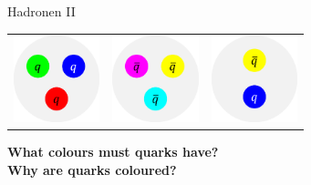 \begin{frame}{Hadronen II}
\begin{table}[]
\begin{tabular}{ccc}
         \includegraphics[width=2.5cm]{Figures Lecture on Hadrons/Baryon_scheme.png} &\includegraphics[width=2.5cm]{Figures Lecture on Hadrons/Antibaryon_scheme.png} &\includegraphics[width=2.5cm]{Figures Lecture on Hadrons/Meson_scheme.png} 
    \end{tabular}
    \label{tab:my_label}
\end{table}
  \end{frame}

\begin{frame}
\textbf{What colours must quarks have? }\\ \textbf{Why are quarks coloured?}
\end{frame}


